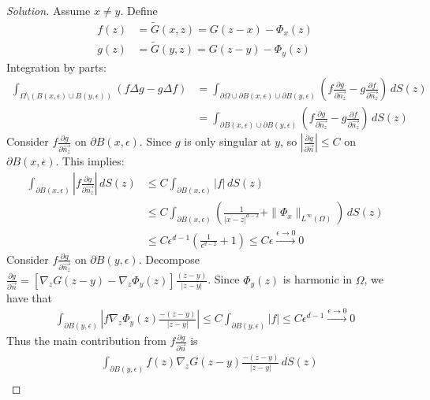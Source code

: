 \documentclass{report}
\theoremstyle{tommy}
\begin{document}
  \begin{proof}[Solution]
    Assume \(x \ne y\). Define \begin{align*}
      f(z) &= \tilde G(x,z) = G(z-x) - \Phi_x(z) \\
      g(z) &= \tilde G(y,z) = G(z-y) - \Phi_y(z)
    \end{align*}
    Integration by parts:
    \begin{align*}
      \int_{\Omega \setminus (B(x, \epsilon) \cup B(y, \epsilon))} (f \Delta g - g \Delta f) 
      &= \int_{\partial \Omega \cup \partial B(x,\epsilon) \cup \partial B(y, \epsilon)} \left(f \frac{\partial g}{\partial \vec{n_z}} - g \frac{\partial f}{\partial \vec{n_z}}\right) \, dS(z) \\
      &= \int_{\partial B(x, \epsilon) \cup \partial B(y, \epsilon)} \left(f \frac{\partial g}{\partial \vec{n_z}} - g \frac{\partial f}{\partial \vec{n_z}}\right)\, dS(z)
    \end{align*}
    Consider \(f \frac{\partial g}{\partial \vec{n_z}}\) on \(\partial B(x,\epsilon)\). Since \(g\) is only singular at \(y\), so \(\left|\frac{\partial g}{\partial \vec{n}}\right| \le C\) on \(\partial B(x,\epsilon)\). This implies:
    \begin{align*}
      \int_{\partial B(x,\epsilon)} \left|f \frac{\partial g}{\partial \vec{n_z}}\right| \, dS(z) 
      &\le C \int_{\partial B(x,\epsilon)}|f| \, dS(z) \\
      &\le C \int_{\partial B(x,\epsilon)} \left(\frac{1}{|x-z|^{d-2}} + \|\Phi_x\|_{L^\infty(\Omega)}\right) \, dS(z) \\
      &\le C \epsilon^{d-1} \left(\frac{1}{\epsilon^{d-2}} + 1\right)
      \le C\epsilon \xrightarrow{\epsilon \to 0} 0
    \end{align*}
    Consider \(f \frac{\partial g}{\partial \vec{n_z}}\) on \(\partial B(y, \epsilon)\). Decompose \(\frac{\partial g}{\partial \vec{n}} = \left[\nabla_z G(z-y) - \nabla_z \Phi_y(z)\right]\frac{(z-y)}{|z-y|}\). Since \(\Phi_y(z)\) is harmonic in \(\Omega\), we have that 
    \begin{align*}
      \int_{\partial B(y,\epsilon)} \left| f \nabla_z \Phi_y(z) \frac{-(z-y)}{|z-y|} \right|
      \le C \int_{\partial B(y,\epsilon)}|f|
      \le C \epsilon^{d-1} \xrightarrow{\epsilon \to 0}0
    \end{align*}
    Thus the main contribution from \(f \frac{\partial g}{\partial \vec{n}}\) is 
    \begin{align*}
      &\int_{\partial B(y, \epsilon)} f(z) \nabla_z G(z-y) \frac{-(z-y)}{|z-y|} \, dS(z) \\

\end{align*}
\end{proof}
\end{document}

